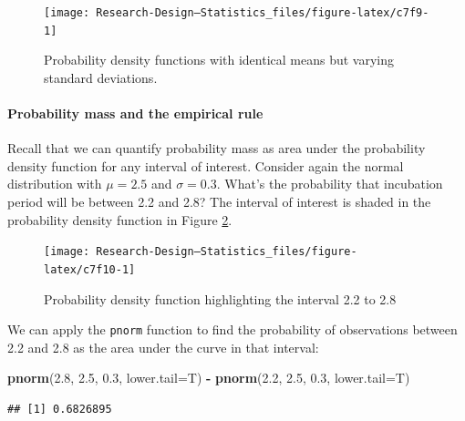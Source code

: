 \documentclass[
]{book}
\newenvironment{Shaded}{\begin{snugshade}}{\end{snugshade}}
\newcommand{\AttributeTok}[1]{\textcolor[rgb]{0.13,0.29,0.53}{#1}}
\newcommand{\FloatTok}[1]{\textcolor[rgb]{0.00,0.00,0.81}{#1}}
\newcommand{\FunctionTok}[1]{\textcolor[rgb]{0.13,0.29,0.53}{\textbf{#1}}}
\newcommand{\NormalTok}[1]{#1}
\newcommand{\SpecialCharTok}[1]{\textcolor[rgb]{0.81,0.36,0.00}{\textbf{#1}}}
\begin{document}
\begin{figure}

{\centering \texttt{[image: Research-Design---Statistics\_files/figure-latex/c7f9-1]} 

}

\caption{Probability density functions with identical means but varying standard deviations.}\label{fig:c7f9}
\end{figure}

\paragraph{Probability mass and the empirical rule}\label{probability-mass-and-the-empirical-rule}

Recall that we can quantify probability mass as area under the probability density function for any interval of interest. Consider again the normal distribution with \(\mu = 2.5\) and \(\sigma = 0.3\). What's the probability that incubation period will be between 2.2 and 2.8? The interval of interest is shaded in the probability density function in Figure \ref{fig:c7f10}.

\begin{figure}

{\centering \texttt{[image: Research-Design---Statistics\_files/figure-latex/c7f10-1]} 

}

\caption{Probability density function highlighting the interval 2.2 to 2.8}\label{fig:c7f10}
\end{figure}

We can apply the \texttt{pnorm} function to find the probability of observations between 2.2 and 2.8 as the area under the curve in that interval:

\begin{Shaded}
\begin{Highlighting}[]
\FunctionTok{pnorm}\NormalTok{(}\FloatTok{2.8}\NormalTok{, }\FloatTok{2.5}\NormalTok{, }\FloatTok{0.3}\NormalTok{, }\AttributeTok{lower.tail=}\NormalTok{T) }\SpecialCharTok{{-}} \FunctionTok{pnorm}\NormalTok{(}\FloatTok{2.2}\NormalTok{, }\FloatTok{2.5}\NormalTok{, }\FloatTok{0.3}\NormalTok{, }\AttributeTok{lower.tail=}\NormalTok{T)}
\end{Highlighting}
\end{Shaded}

\begin{verbatim}
## [1] 0.6826895
\end{verbatim}
\end{document}
